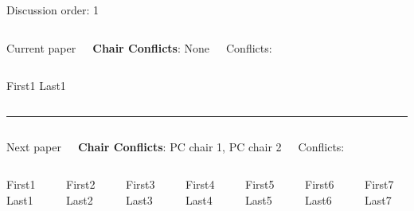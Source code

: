 \documentclass[9pt,t,serif]{beamer}
\begin{document}
\begin{frame}[t]{Discussion order: 1}
\begin{columns}[t]
Current paper 

\textbf{Chair Conflicts}: None

Conflicts:

\vspace{10pt}

\end{columns}
\begin{columns}[t]
First1 Last1

\end{columns}
\vspace{10pt}
\hrule
\vspace{10pt}
\begin{columns}[t]


 Next paper

\textbf{Chair Conflicts}: PC chair 1, PC chair 2

Conflicts:

\vspace{10pt}

\end{columns}
\begin{columns}[t]
First1 Last1

First2 Last2

First3 Last3

First4 Last4

First5 Last5

First6 Last6

First7 Last7

\end{columns}
\end{frame}
\end{document}
